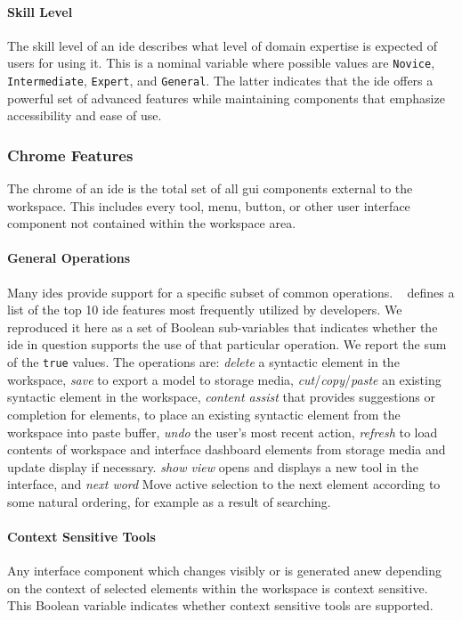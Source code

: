 \paragraph{Skill Level}
The skill level of an \ac{ide} describes what level of domain expertise is expected of users for using it.
This is a nominal variable where possible values are \texttt{Novice}, \texttt{Intermediate}, \texttt{Expert}, and \texttt{General}.
The latter indicates that the \ac{ide} offers a powerful set of advanced features while maintaining components that emphasize accessibility and ease of use.


\subsubsection{Chrome Features} \label{subsubsec:chrome}

The chrome of an \ac{ide} is the total set of all \acf{gui} components
external to the workspace. This includes every tool, menu, button, or other
user interface component not contained within the workspace area.


\paragraph{General Operations}
Many \acp{ide} provide support for a specific subset of common operations.
\citeauthor{murphy2006}~\cite{murphy2006} defines a list of the top 10 \ac{ide} features most frequently utilized by developers.
We reproduced it here as a set of Boolean sub-variables that indicates whether the \ac{ide} in question supports the use of that particular operation.
We report the sum of the \texttt{true} values.
The operations are: \emph{delete} a syntactic element in the workspace,
\emph{save} to export a model to storage media,
\emph{cut}/\emph{copy}/\emph{paste} an existing syntactic element in the workspace,
\emph{content assist} that provides suggestions or completion for elements,
 to place an existing syntactic element from the workspace into paste buffer,
\emph{undo} the user's most recent action,
\emph{refresh} to load contents of workspace and interface dashboard elements from storage media and update display if necessary.
\emph{show view} opens and displays a new tool in the interface,
and
\emph{next word} Move active selection to the next element according to some natural ordering, for example as a result of searching.


\paragraph{Context Sensitive Tools}
Any interface component which changes visibly or is generated anew depending on the context of selected elements within the workspace is context sensitive.
This Boolean variable indicates whether context sensitive tools are supported.


